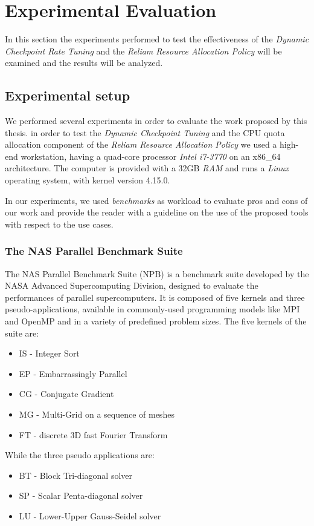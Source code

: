 %
%
\chapter{Experimental Evaluation}
%
%
\label{cap:experimental}
In this section the experiments performed to test the effectiveness of the \emph{Dynamic Checkpoint Rate Tuning} and the \emph{Reliam Resource Allocation Policy} will be examined and the results will be analyzed.
\section{Experimental setup}
We performed several experiments in order to evaluate the work proposed by this thesis. in order to test the \emph{Dynamic Checkpoint Tuning} and the CPU quota allocation component of the \emph{Reliam Resource Allocation Policy} we used a high-end workstation, having a quad-core processor \emph{Intel i7-3770} on an x86\_64 architecture. The computer is provided with a 32GB \emph{RAM} and runs a \emph{Linux} operating system, with kernel version 4.15.0.

In our experiments, we used \emph{benchmarks} as workload to evaluate pros and cons of our work and provide the reader with a guideline on the use of the proposed tools with respect to the use cases.

\subsection{The NAS Parallel Benchmark Suite}
The NAS Parallel Benchmark Suite (NPB) \cite{doi:10.1177/109434209100500306} is a benchmark suite developed by the NASA Advanced Supercomputing Division, designed to evaluate the performances of parallel supercomputers. It is composed of five kernels and three pseudo-applications, available in commonly-used programming models like MPI and OpenMP and in a variety of predefined problem sizes.
The five kernels of the suite are:
\begin{itemize}
\item IS - Integer Sort
\item EP - Embarrassingly Parallel 
\item CG - Conjugate Gradient
\item MG - Multi-Grid on a sequence of meshes 
\item FT - discrete 3D fast Fourier Transform
\end{itemize}
While the three pseudo applications are:
\begin{itemize}
\item BT - Block Tri-diagonal solver
\item SP - Scalar Penta-diagonal solver
\item LU - Lower-Upper Gauss-Seidel solver
\end{itemize}

